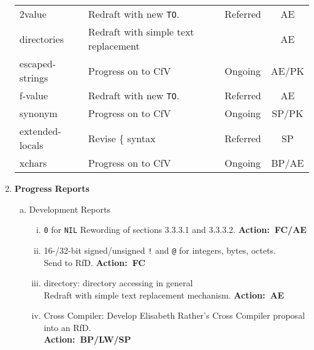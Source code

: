 \documentclass{article}
\newcommand{\action}[1]{%
	\mbox{}\hfill \textbf{Action:~#1}%
}
\newcommand{\word}[1]{\texttt{#1}}
\begin{document}
\begin{enumerate}[1. ]
\begin{tabular}{p{6.5em}p{22.5em}lc}
\textsf{2value}
	& Redraft with new \word{TO}.
	& Referred
	& AE \\

\textsf{directories}
	& Redraft with simple text replacement
	&
	& AE \\

\textsf{escaped-strings}
	& Progress on to CfV
	& Ongoing
	& AE/PK \\

\textsf{f-value}
	& Redraft with new \word{TO}.
	& Referred
	& AE \\

\textsf{synonym}
	& Progress on to CfV
	& Ongoing
	& SP/PK \\

\textsf{extended-locals}
	& Revise \{ syntax
	& Referred
	& SP \\

\textsf{xchars}
	& Progress on to CfV
	& Ongoing
	& BP/AE \\
\end{tabular}

%
%

\item \textbf{Progress Reports}

\begin{enumerate}[a)]
\item Development Reports
	\begin{enumerate}[i)]
	\item \word{0} for \word{NIL}
		Rewording of sections 3.3.3.1 and 3.3.3.2.\action{FC/AE}

	\item 16-/32-bit signed/unsigned \word{!} and \word{@} for integers,
		bytes, octets.\\
		Send to RfD. \action{FC}

	\item \textsf{directory}: directory accessing in general \\
		Redraft with simple text replacement mechanism. \action{AE}

	\item \textsf{Cross Compiler:}
		Develop Elisabeth Rather's Cross Compiler proposal into an
		RfD. \\
		\action{BP/LW/SP}


\end{enumerate}
\end{enumerate}
\end{enumerate}
\end{document}
